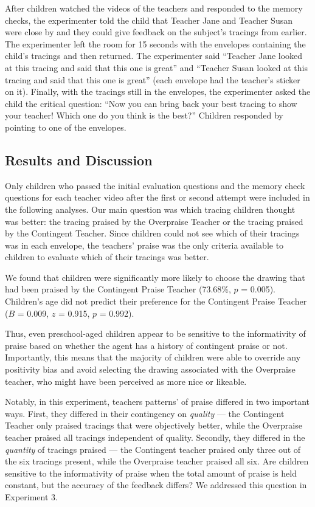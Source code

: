 \documentclass[10pt, letterpaper]{article}
\begin{document}
After children watched the videos of the teachers and responded to the
memory checks, the experimenter told the child that Teacher Jane and
Teacher Susan were close by and they could give feedback on the
subject's tracings from earlier. The experimenter left the room for 15
seconds with the envelopes containing the child's tracings and then
returned. The experimenter said ``Teacher Jane looked at this tracing
and said that this one is great'' and ``Teacher Susan looked at this
tracing and said that this one is great'' (each envelope had the
teacher's sticker on it). Finally, with the tracings still in the
envelopes, the experimenter asked the child the critical question: ``Now
you can bring back your best tracing to show your teacher! Which one do
you think is the best?'' Children responded by pointing to one of the
envelopes.

\subsection{Results and Discussion}\label{results-and-discussion-1}

Only children who passed the initial evaluation questions and the memory
check questions for each teacher video after the first or second attempt
were included in the following analyses. Our main question was which
tracing children thought was better: the tracing praised by the
Overpraise Teacher or the tracing praised by the Contingent Teacher.
Since children could not see which of their tracings was in each
envelope, the teachers' praise was the only criteria available to
children to evaluate which of their tracings was better.

We found that children were significantly more likely to choose the
drawing that had been praised by the Contingent Praise Teacher (73.68\%,
\(p\) = 0.005). Children's age did not predict their preference for the
Contingent Praise Teacher (\(B\) = 0.009, \(z\) = 0.915, \(p\) = 0.992).

Thus, even preschool-aged children appear to be sensitive to the
informativity of praise based on whether the agent has a history of
contingent praise or not. Importantly, this means that the majority of
children were able to override any positivity bias and avoid selecting
the drawing associated with the Overpraise teacher, who might have been
perceived as more nice or likeable.

Notably, in this experiment, teachers patterns' of praise differed in
two important ways. First, they differed in their contingency on
\emph{quality} --- the Contingent Teacher only praised tracings that
were objectively better, while the Overpraise teacher praised all
tracings independent of quality. Secondly, they differed in the
\emph{quantity} of tracings praised --- the Contingent teacher praised
only three out of the six tracings present, while the Overpraise teacher
praised all six. Are children sensitive to the informativity of praise
when the total amount of praise is held constant, but the accuracy of
the feedback differs? We addressed this question in Experiment 3.
\end{document}
